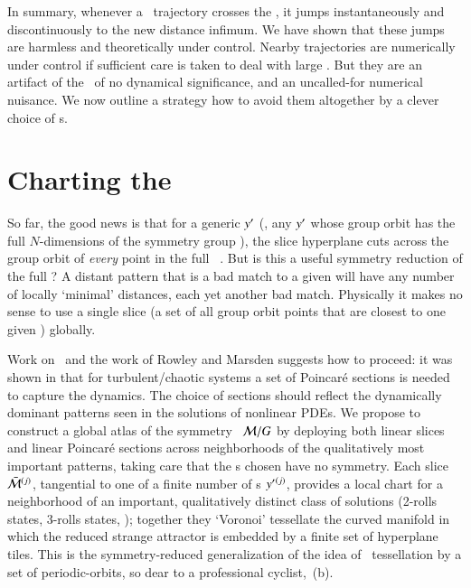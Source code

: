 \documentclass[preprint,12pt]{elsarticle} %
\begin{document}
In summary, whenever a \reducedsp\ trajectory crosses the {\sset}, it
jumps instantaneously and discontinuously to the new distance infimum. We
have shown that these jumps are harmless and theoretically under control.
Nearby trajectories are numerically under control if sufficient care is
taken to deal with large \angVels. But they are an artifact of the
\mslices\ of no dynamical significance, and an uncalled-for numerical
nuisance. We now outline a strategy how to avoid them altogether by a
clever choice of {\template s}.


\section{Charting the \reducedsp}
	\label{sec:chart}

So far, the good news is that for a generic {\template} ${y'}$ (\ie,
any ${y'}$ whose group orbit has the full $N$-dimensions of the
symmetry group \Group), the slice hyperplane  cuts across
the group orbit of {\em every} point in the full \statesp\ \pS. But is
this a useful symmetry reduction of the full \statesp? A distant pattern
that is a bad match to a given {\template} will have any number of
locally `minimal' distances, each yet another bad match. Physically it
makes no sense to use a single slice (a set of all group orbit points
that are closest to one given {\template}) globally.

Work on \KS\ and the work of Rowley and
Marsden suggests how to proceed: it was
shown in  that for turbulent/chaotic systems a
set of Poincar\'e sections is needed to capture the dynamics. The choice
of sections should reflect the dynamically dominant patterns seen in the
solutions of nonlinear PDEs. We propose to construct a global atlas of
the symmetry \reducedsp\ ${\cal M}/G$ by deploying both linear slices and
linear Poincar\'e sections across neighborhoods of the qualitatively most
important patterns, taking care that the {\template s} chosen have no
symmetry. Each slice $\bar{\cal M}{}^{(j)}$, tangential to one of a finite
number of {\template s}  ${y'}{}^{(j)}$, provides a local chart for a
neighborhood of an important, qualitatively distinct class of solutions
(2-rolls states, 3-rolls states, \etc); together they `Voronoi'
tessellate  the curved manifold in which the reduced strange attractor is
embedded by a finite set of hyperplane
tiles. This is the symmetry-reduced
generalization of the idea of {\statesp\ tessellation} by a set of
periodic-orbits, so dear to a professional cyclist,
\,(b).
\end{document}
